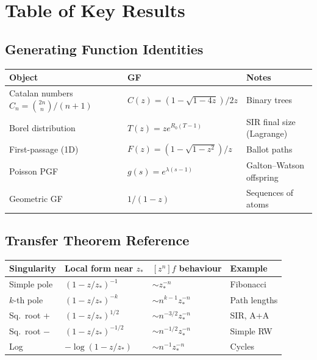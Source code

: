 \documentclass[11pt,a4paper]{article}
\theoremstyle{definition}
\begin{document}
\clearpage

\appendix

\section{Table of Key Results}
\label{app:table}

\subsection{Generating Function Identities}

\begin{center}
\begin{tabular}{lll}
\toprule
Object & GF & Notes \\
\midrule
Catalan numbers $C_n = \binom{2n}{n}/(n+1)$ & $C(z) = (1-\sqrt{1-4z})/2z$ & Binary trees \\
Borel distribution & $T(z) = ze^{R_0(T-1)}$ & SIR final size (Lagrange) \\
First-passage (1D) & $F(z) = (1-\sqrt{1-z^2})/z$ & Ballot paths \\
Poisson PGF & $g(s) = e^{\lambda(s-1)}$ & Galton--Watson offspring \\
Geometric GF & $1/(1-z)$ & Sequences of atoms \\
\bottomrule
\end{tabular}
\end{center}

\subsection{Transfer Theorem Reference}

\begin{center}
\begin{tabular}{llll}
\toprule
Singularity & Local form near $z_*$ & $[z^n]f$ behaviour & Example \\
\midrule
Simple pole & $(1-z/z_*)^{-1}$ & $\sim z_*^{-n}$ & Fibonacci \\
$k$-th pole & $(1-z/z_*)^{-k}$ & $\sim n^{k-1}z_*^{-n}$ & Path lengths \\
Sq.\ root + & $(1-z/z_*)^{1/2}$ & $\sim n^{-3/2}z_*^{-n}$ & SIR, A+A \\
Sq.\ root $-$ & $(1-z/z_*)^{-1/2}$ & $\sim n^{-1/2}z_*^{-n}$ & Simple RW \\
Log & $-\log(1-z/z_*)$ & $\sim n^{-1}z_*^{-n}$ & Cycles \\
\bottomrule
\end{tabular}
\end{center}
\end{document}
